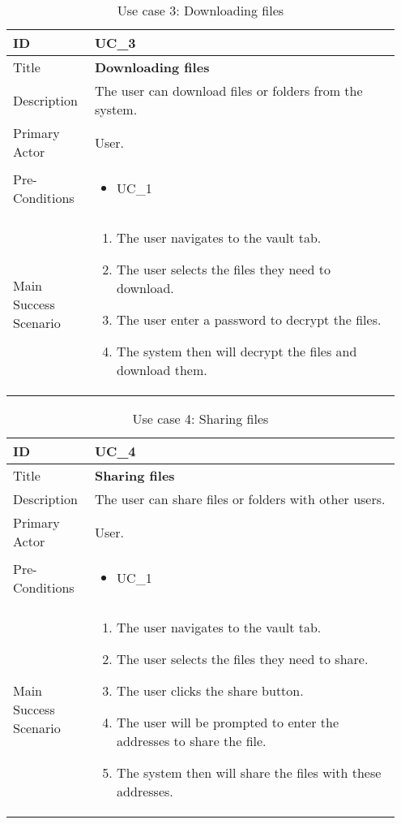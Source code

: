 \begin{longtable}{p{0.20\linewidth} | p{0.75\linewidth}}
  \caption{Use case 3: Downloading files}
  \label{tab:useCaseDownload}
  \\\toprule
  ID & UC\_3
  \\\midrule
  Title & \textbf{Downloading files}
  \\\hline
  Description & The user can download files or folders from the system.
  \\\hline
  Primary Actor & User.
  \\\hline
  Pre-Conditions & {
    \begin{itemize}
    \item UC\_1
    \end{itemize}
  }\vspace*{-\baselineskip}
  \\\hline
  Main Success Scenario & {
    \begin{enumerate}
    \item The user navigates to the vault tab.
    \item The user selects the files they need to download.
    \item The user enter a password to decrypt the files.
    \item The system then will decrypt the files and download them.
    \end{enumerate}
  }\vspace*{-\baselineskip}
  \\\bottomrule
\end{longtable}

\begin{longtable}{p{0.20\linewidth} | p{0.75\linewidth}}
  \caption{Use case 4: Sharing files}
  \label{tab:useCaseShare}
  \\\toprule
  ID & UC\_4
  \\\midrule
  Title & \textbf{Sharing files}
  \\\hline
  Description & The user can share files or folders with other users.
  \\\hline
  Primary Actor & User.
  \\\hline
  Pre-Conditions & {
    \begin{itemize}
    \item UC\_1
    \end{itemize}
  }\vspace*{-\baselineskip}
  \\\hline
  Main Success Scenario & {
    \begin{enumerate}
    \item The user navigates to the vault tab.
    \item The user selects the files they need to share.
    \item The user clicks the share button.
    \item The user will be prompted to enter the addresses to share the file.
    \item The system then will share the files with these addresses.
    \end{enumerate}
  }\vspace*{-\baselineskip}
  \\\bottomrule
\end{longtable}

